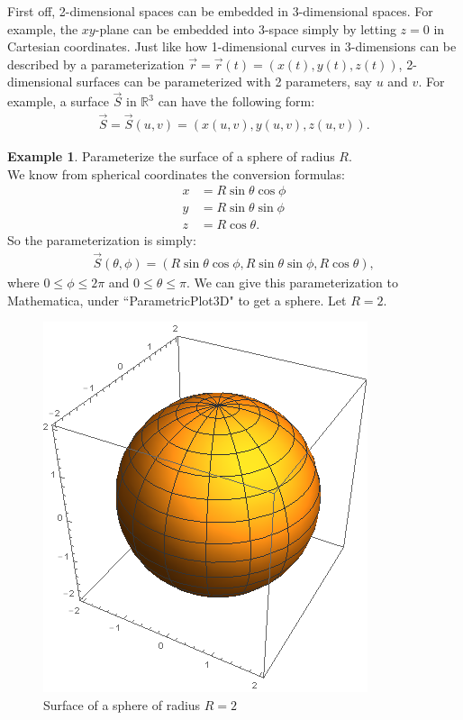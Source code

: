 \documentclass{article}
\theoremstyle{definition}
\newtheorem{exmp}{Example}[section]
\begin{document}
First off, 2-dimensional spaces can be embedded in 3-dimensional spaces. For example, the $xy$-plane can be embedded into 3-space simply by letting $z=0$ in Cartesian coordinates. Just like how 1-dimensional curves in 3-dimensions can be described by a parameterization $\vec{r} = \vec{r}(t) = (x(t),y(t),z(t))$, 2-dimensional surfaces can be parameterized with 2 parameters, say $u$ and $v$. For example, a surface $\vec{S}$ in $\mathbb{R}^3$ can have the following form:
\begin{align*}
\vec{S} = \vec{S}(u,v) = (x(u,v), y(u,v), z(u,v)).
\end{align*}

\begin{exmp}
	Parameterize the surface of a sphere of radius $R$.\\
	
	We know from spherical coordinates the conversion formulas:
	\begin{align*}
	x &= R\sin\theta\cos\phi\\
	y &= R\sin\theta\sin\phi\\
	z &= R\cos\theta.
	\end{align*}
	So the parameterization is simply:
	\begin{align*}
	\vec{S}(\theta, \phi) = (R\sin\theta\cos\phi, R\sin\theta\sin\phi, R\cos\theta),
	\end{align*}
	where $0 \leq \phi \leq 2\pi$ and $0\leq \theta \leq \pi$. We can give this parameterization to Mathematica, under ``ParametricPlot3D" to get a sphere. Let $R=2$.
	\begin{figure}[h!]
		\centering
		\includegraphics[scale=0.5]{gr-fig-15.png}
		\caption{Surface of a sphere of radius $R=2$}
	\end{figure}
\end{exmp}
\end{document}

